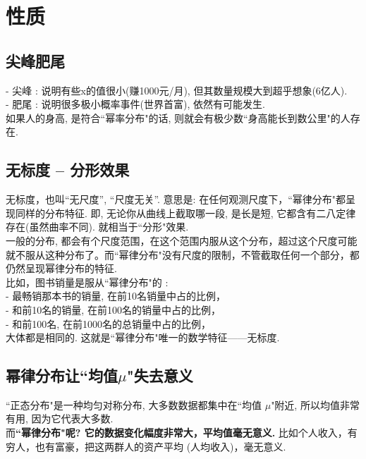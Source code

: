 \documentclass[UTF8]{ctexart}
\begin{document}
	
	
	\section{性质}
	
	\subsection{尖峰肥尾} 
	
	- 尖峰 : 说明有些x的值很小(赚1000元/月), 但其数量规模大到超乎想象(6亿人). \\
	- 肥尾 : 说明很多极小概率事件(世界首富), 依然有可能发生. \\
	
	如果人的身高, 是符合``幂率分布"的话, 则就会有极少数``身高能长到数公里"的人存在. 
	
	
	
	\subsection{无标度 -- 分形效果}
	
	无标度，也叫``无尺度”, ``尺度无关”. 意思是: 在任何观测尺度下，``幂律分布"都呈现同样的分布特征. 即, 无论你从曲线上截取哪一段, 是长是短, 它都含有二八定律存在(虽然曲率不同). 就相当于``分形"效果. \\	
	一般的分布, 都会有个尺度范围，在这个范围内服从这个分布，超过这个尺度可能就不服从这种分布了。而``幂律分布"没有尺度的限制，不管截取任何一个部分，都仍然呈现幂律分布的特征. \\
	
	比如，图书销量是服从``幂律分布"的 : \\
	- 最畅销那本书的销量, 在前10名销量中占的比例， \\
	- 和前10名的销量, 在前100名的销量中占的比例， \\
	- 和前100名, 在前1000名的总销量中占的比例，\\
	大体都是相同的. 这就是``幂律分布"唯一的数学特征——无标度.
	
	
	
	\subsection{幂律分布让``均值$\mu$"失去意义} 
	
	``正态分布"是一种均匀对称分布, 大多数数据都集中在``均值 $\mu$"附近, 所以均值非常有用, 因为它代表大多数. \\	
	而\textbf{``幂律分布"呢? 它的数据变化幅度非常大，平均值毫无意义.} 比如个人收入，有穷人，也有富豪，把这两群人的资产平均 (人均收入)，毫无意义. 
	
\end{document}
